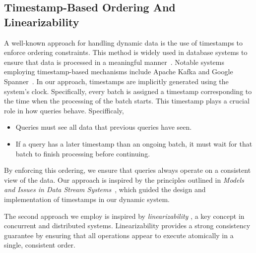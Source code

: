 \subsection{Timestamp-Based Ordering And Linearizability}  

A well-known approach for handling dynamic data is the use of timestamps to enforce ordering 
constraints. This method is widely used in database systems to ensure that data is processed
in a meaningful manner~\cite{babcock2002}. Notable systems employing timestamp-based mechanisms
include Apache Kafka and Google Spanner~\cite{kafka2021,spanner2013}.  
% 
In our approach, timestamps are implicitly generated using the system's clock. Specifically,
every batch is assigned a timestamp corresponding to the time when the processing of the batch
starts. This timestamp plays a crucial role in  how queries behave. Specifficaly,   

\begin{itemize} [noitemsep, topsep=3pt, partopsep=0pt, parsep=0pt]
    \item Queries must see all data that previous queries have seen.  
    \item If a query has a later timestamp than an ongoing batch, it must wait for that batch to
     finish processing before continuing.  
\end{itemize}  
% 
By enforcing this ordering, we ensure that queries always operate on a consistent view of the data.
Our approach is inspired by the principles outlined in \textit{Models and Issues in Data Stream
Systems}~\cite{babcock2002}, which guided the design and implementation of timestamps in our dynamic system.  

The second approach we employ is inspired by \textit{linearizability}
\cite{herlihyWingLinearizability}, a key concept in concurrent
and distributed systems. Linearizability provides a strong consistency guarantee by ensuring
that all operations appear to execute atomically in a single, consistent order.  

